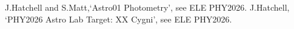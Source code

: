 \documentclass{article}
\begin{document}






\begin{thebibliography}{9}
 J.Hatchell and S.Matt,`Astro01 Photometry', see ELE PHY2026.
 J.Hatchell, `PHY2026 Astro Lab Target: XX Cygni', see ELE PHY2026. 
\end{thebibliography}
\end{document}
